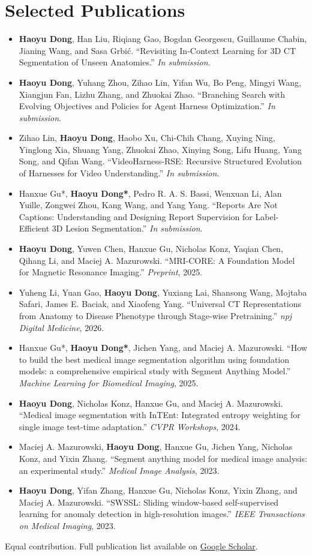 \documentclass[letterpaper,10pt]{article}
\newcommand{\pub}[1]{\item #1}
\begin{document}
\newpage
\section{Selected Publications}
\begin{itemize}[leftmargin=0.18in,topsep=2pt,itemsep=4pt,parsep=0pt]
  \pub{\textbf{Haoyu Dong}, Han Liu, Riqiang Gao, Bogdan Georgescu, Guillaume Chabin, Jianing Wang, and Sasa Grbi\'c. ``Revisiting In-Context Learning for 3D CT Segmentation of Unseen Anatomies.'' \textit{In submission}.}
  \pub{\textbf{Haoyu Dong}, Yuhang Zhou, Zihao Lin, Yifan Wu, Bo Peng, Mingyi Wang, Xiangjun Fan, Lizhu Zhang, and Zhuokai Zhao. ``Branching Search with Evolving Objectives and Policies for Agent Harness Optimization.'' \textit{In submission}.}
  \pub{Zihao Lin, \textbf{Haoyu Dong}, Haobo Xu, Chi-Chih Chang, Xuying Ning, Yinglong Xia, Shuang Yang, Zhuokai Zhao, Xinying Song, Lifu Huang, Yang Song, and Qifan Wang. ``VideoHarness-RSE: Recursive Structured Evolution of Harnesses for Video Understanding.'' \textit{In submission}.}
  \pub{Hanxue Gu*, \textbf{Haoyu Dong*}, Pedro R. A. S. Bassi, Wenxuan Li, Alan Yuille, Zongwei Zhou, Kang Wang, and Yang Yang. ``Reports Are Not Captions: Understanding and Designing Report Supervision for Label-Efficient 3D Lesion Segmentation.'' \textit{In submission}.}
  \pub{\textbf{Haoyu Dong}, Yuwen Chen, Hanxue Gu, Nicholas Konz, Yaqian Chen, Qihang Li, and Maciej A. Mazurowski. ``MRI-CORE: A Foundation Model for Magnetic Resonance Imaging.'' \textit{Preprint}, 2025.}
  \pub{Yuheng Li, Yuan Gao, \textbf{Haoyu Dong}, Yuxiang Lai, Shansong Wang, Mojtaba Safari, James E. Baciak, and Xiaofeng Yang. ``Universal CT Representations from Anatomy to Disease Phenotype through Stage-wise Pretraining.'' \textit{npj Digital Medicine}, 2026.}
  \pub{Hanxue Gu*, \textbf{Haoyu Dong*}, Jichen Yang, and Maciej A. Mazurowski. ``How to build the best medical image segmentation algorithm using foundation models: a comprehensive empirical study with Segment Anything Model.'' \textit{Machine Learning for Biomedical Imaging}, 2025.}
  \pub{\textbf{Haoyu Dong}, Nicholas Konz, Hanxue Gu, and Maciej A. Mazurowski. ``Medical image segmentation with InTEnt: Integrated entropy weighting for single image test-time adaptation.'' \textit{CVPR Workshops}, 2024.}
  \pub{Maciej A. Mazurowski, \textbf{Haoyu Dong}, Hanxue Gu, Jichen Yang, Nicholas Konz, and Yixin Zhang. ``Segment anything model for medical image analysis: an experimental study.'' \textit{Medical Image Analysis}, 2023.}
  \pub{\textbf{Haoyu Dong}, Yifan Zhang, Hanxue Gu, Nicholas Konz, Yixin Zhang, and Maciej A. Mazurowski. ``SWSSL: Sliding window-based self-supervised learning for anomaly detection in high-resolution images.'' \textit{IEEE Transactions on Medical Imaging}, 2023.}
\end{itemize}
\vspace{-5pt}
\small * Equal contribution. Full publication list available on \href{https://scholar.google.com/citations?hl=en\&user=eZVEUCIAAAAJ\&view_op=list_works}{Google Scholar}.
\end{document}

